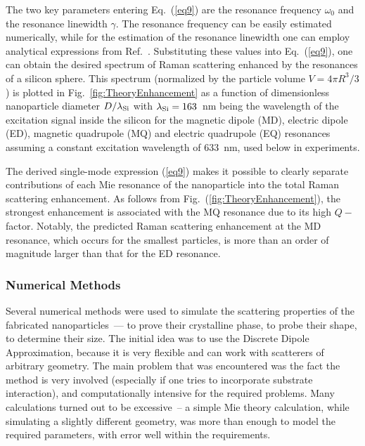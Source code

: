         The two key parameters entering Eq.~(\ref{eq9}) are the resonance frequency $\omega_0$ and the resonance linewidth $\gamma$.
        The resonance frequency can be easily estimated numerically, while for the estimation of the resonance linewidth one can
        employ analytical expressions from Ref.~\cite{lai1991effect}. Substituting these values into Eq.~(\ref{eq9}), one can obtain the desired
        spectrum of Raman scattering enhanced by the resonances of a silicon sphere. This spectrum (normalized by the particle
        volume $V=4\pi R^3/3$) is plotted in Fig.~\ref{fig:TheoryEnhancement} as a  function of dimensionless nanoparticle diameter $D/\lambda_{\rm Si}$
        with $\lambda_{\rm Si}=163$~nm being the wavelength of the excitation signal inside the silicon for the magnetic dipole (MD), electric dipole (ED),
        magnetic quadrupole (MQ) and electric quadrupole (EQ) resonances assuming a constant excitation wavelength of 633~nm,
        used below in experiments.

        The derived single-mode expression (\ref{eq9}) makes it possible to clearly separate contributions of each Mie resonance of the
        nanoparticle into the total Raman scattering enhancement. As follows from Fig.~(\ref{fig:TheoryEnhancement}), the strongest enhancement
        is associated with the MQ resonance due to its high $Q-$factor. Notably, the predicted Raman scattering enhancement
        at the MD resonance, which occurs for the smallest particles, is more than an order of magnitude larger than that for
        the ED resonance.


    \subsubsection{Numerical Methods}
    \label{sec:Numeric}
        Several numerical methods were used to simulate the scattering properties of the fabricated nanoparticles~--- to prove their
        crystalline phase, to probe their shape, to determine their size. The initial idea was to use the Discrete Dipole Approximation,
        because it is very flexible and can work with scatterers of arbitrary geometry. The main problem that was encountered was the fact
        the method is very involved (especially if one tries to incorporate substrate interaction), and computationally intensive for
        the required problems. Many calculations turned out to be excessive~-- a simple Mie theory calculation,
        while simulating a slightly different geometry, was more than enough to model the required parameters, with error well within the
        requirements.

